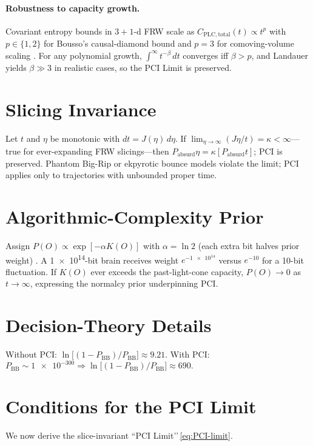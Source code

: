 \documentclass[12pt]{article}
\newcommand{\PCI}{PCI\xspace}
\begin{document}
\paragraph{Robustness to capacity growth.}
Covariant entropy bounds in $3+1$-d FRW scale as
$C_{\mathrm{PLC,total}}(t)\propto t^{p}$ with
$p\in\{1,2\}$ for Bousso’s causal-diamond bound and $p=3$ for
comoving-volume scaling \cite{bousso1999}.
For any polynomial growth, $\int^\infty t^{-\beta}\,dt$ converges
iff $\beta>p$, and Landauer yields $\beta\gg3$ in realistic cases, so the
\PCI Limit is preserved.

\section{Slicing Invariance}\label{app:slicing}
Let $t$ and $\eta$ be monotonic with $dt=J(\eta)\,d\eta.$ If $\lim_{\eta\to\infty}(J\eta/t)=\kappa<\infty$—true for ever-expanding FRW slicings—then $P_{\text{absurd}}\eta=\kappa[P_{\text{absurd}}t]$; \PCI is preserved. Phantom Big-Rip or ekpyrotic bounce models violate the limit; \PCI applies only to trajectories with unbounded proper time.

\section{Algorithmic-Complexity Prior}\label{app:complexity}
Assign $P(O)\propto\exp[-\alpha K(O)]$ with $\alpha=\ln2$ (each extra bit halves prior weight) \cite{li2008}. A \num{1e14}-bit brain receives weight $e^{-\num{1e14}}$ versus $e^{-10}$ for a 10-bit fluctuation. If $K(O)$ ever exceeds the past-light-cone capacity, $P(O)\to0$ as $t\to\infty$, expressing the normalcy prior underpinning \PCI.

\section{Decision-Theory Details}\label{app:decision}
Without \PCI: $\ln\!\bigl[(1-P_{\text{BB}})/P_{\text{BB}}\bigr]\approx9.21.$  
With \PCI: $P_{\text{BB}}\sim\num{1e-300}\Rightarrow\ln\!\bigl[(1-P_{\text{BB}})/P_{\text{BB}}\bigr]\approx690.$

\section[Conditions for the \PCI Limit]%
{Conditions for the \PCI Limit}\label{app:derivation}

We now derive the slice-invariant ``\PCI Limit’’\,\eqref{eq:PCI-limit}.
\end{document}
